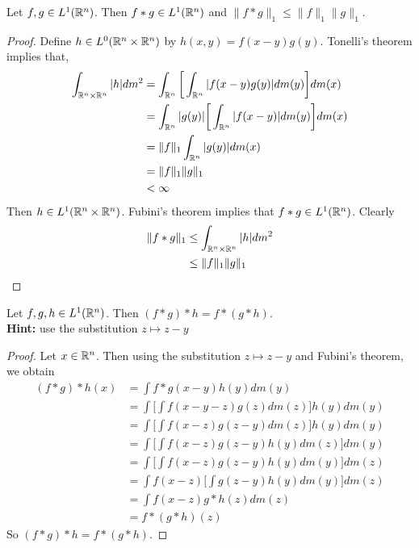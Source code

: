 \documentclass{book}
\begin{document}
	\begin{ex}
	Let $f, g \in L^1(\mathbb{R}^n)$. Then $f * g \in L^1(\mathbb{R}^n)$ and $\|f * g\|_1 \leq \|f\|_1 \|g\|_1$. 
	\end{ex}	
	
	\begin{proof}
	Define $h \in L^0(\mathbb{R}^n \times \mathbb{R}^n)$ by $h(x,y) = f(x-y)g(y)$. Tonelli's theorem implies that, 
	\begin{align*}
	\int_{\mathbb{R}^n \times \mathbb{R}^n} |h| dm^2
	&= \int_{\mathbb{R}^n} \bigg[  \int_{\mathbb{R}^n} |f(x-y)g(y)| dm(y) \bigg] dm(x) \\
	&= \int_{\mathbb{R}^n} |g(y)| \bigg[  \int_{\mathbb{R}^n} |f(x-y)| dm(y) \bigg] dm(x) \\
	&=  \|f\|_1 \int_{\mathbb{R}^n} |g(y)| dm(x) \\
	&= \|f\|_1 \|g\|_1\\
	& < \infty
	\end{align*}
	Then $h \in L^1(\mathbb{R}^n \times \mathbb{R}^n)$. Fubini's theorem implies that $f * g \in L^1(\mathbb{R}^n)$. Clearly 
	\begin{align*}
	\|f *g\|_1 
	& \leq \int_{\mathbb{R}^n \times \mathbb{R}^n} |h| dm^2 \\
	& \leq \|f\|_1 \|g\|_1
	\end{align*}
	\end{proof}
	
	
	
	\begin{ex}
	 Let $f, g, h \in L^1(\mathbb{R}^n)$. Then $(f * g) * h = f * (g * h)$. \\
	\textbf{Hint:} use the substitution $z \mapsto z-y$
	\end{ex}
	
	\begin{proof}
	Let $x \in \mathbb{R}^n$. Then using the substitution $z \mapsto z-y$ and Fubini's theorem, we obtain
	\begin{align*}
	(f*g)*h(x) 
	&= \int f * g(x - y) h (y) dm(y) \\
	&= \int \bigg[ \int f(x-y-z) g(z) dm(z)  \bigg] h(y) dm(y) \\
	&= \int \bigg[ \int f(x-z) g(z - y) dm(z)  \bigg] h(y) dm(y) \\
	&= \int \bigg[ \int f(x-z) g(z - y)  h(y)dm(z)  \bigg]  dm(y) \\
	&= \int \bigg[ \int f(x-z) g(z - y)  h(y) dm(y)  \bigg] dm(z) \\
	&= \int f(x-z) \bigg[ \int g(z - y)  h(y) dm(y)  \bigg] dm(z) \\
	&= \int f(x-z) g*h(z) dm(z) \\
	&= f*(g*h)(z)
	\end{align*}
	So $(f*g)*h = f*(g*h)$. 
	\end{proof}
	
\end{document}
